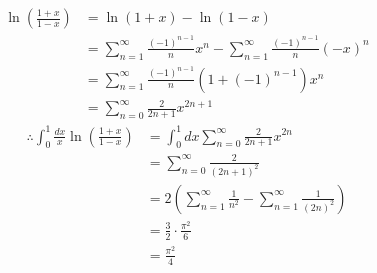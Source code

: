 \item

\begin{align*}
	\ln \left( \frac{1 + x}{1 - x} \right)
	 & = \ln(1 + x) - \ln(1 - x)                                                                                  \\
	 & = \sum_{n = 1}^\infty \frac{{(-1)}^{n - 1}}{n} x^n - \sum_{n = 1}^\infty \frac{{(-1)}^{n - 1}}{n} {(-x)}^n \\
	 & = \sum_{n = 1}^\infty \frac{{(-1)}^{n - 1}}{n} \left( 1 + {(-1)}^{n - 1} \right) x^n                       \\
	 & = \sum_{n = 0}^\infty \frac{2}{2n + 1} x^{2n + 1}
\end{align*}
\begin{align*}
	\therefore \int_0^1 \frac{dx}{x} \ln \left( \frac{1 + x}{1 - x} \right)
	 & = \int_0^1 dx \sum_{n = 0}^\infty \frac{2}{2n + 1} x^{2n} \\
	 & = \sum_{n = 0}^\infty \frac{2}{{(2n + 1)}^2}              \\
	 & = 2 \left(
	\sum_{n = 1}^\infty \frac{1}{n^2} - \sum_{n = 1}^\infty \frac{1}{{(2n)}^2}
	\right)                                                      \\
	 & = \frac{3}{2} \cdot \frac{\pi^2}{6}                       \\
	 & = \frac{\pi^2}{4}
\end{align*}